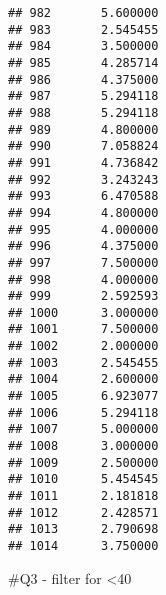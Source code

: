 \documentclass[
  ignorenonframetext,
]{beamer}
\begin{document}
\begin{frame}[fragile]
\begin{verbatim}
## 982       5.600000
## 983       2.545455
## 984       3.500000
## 985       4.285714
## 986       4.375000
## 987       5.294118
## 988       5.294118
## 989       4.800000
## 990       7.058824
## 991       4.736842
## 992       3.243243
## 993       6.470588
## 994       4.800000
## 995       4.000000
## 996       4.375000
## 997       7.500000
## 998       4.000000
## 999       2.592593
## 1000      3.000000
## 1001      7.500000
## 1002      2.000000
## 1003      2.545455
## 1004      2.600000
## 1005      6.923077
## 1006      5.294118
## 1007      5.000000
## 1008      3.000000
## 1009      2.500000
## 1010      5.454545
## 1011      2.181818
## 1012      2.428571
## 1013      2.790698
## 1014      3.750000
\end{verbatim}

\#Q3 - filter for \textless40


\end{frame}
\end{document}
